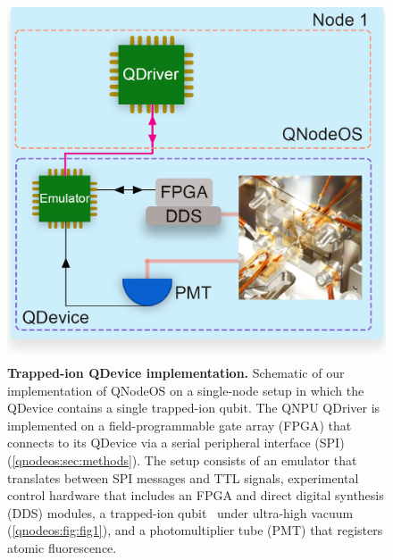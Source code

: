 \begin{figure}[htb]
\centering
\includegraphics[width=1\linewidth]{figures/qnodeos/main/fig5/fig5.png}
\caption{\textbf{Trapped-ion QDevice implementation.} Schematic of our implementation of QNodeOS on a single-node setup in which the QDevice contains a single trapped-ion qubit. The QNPU QDriver is implemented on a field-programmable gate array (FPGA) that connects to its QDevice via a serial peripheral interface (SPI) (\cref{qnodeos:sec:methods}). The setup consists of an emulator that translates between SPI messages and TTL signals, experimental control hardware that includes an FPGA and direct digital synthesis (DDS) modules, a trapped-ion qubit~\cite{teller2023integrating} under ultra-high vacuum (\cref{qnodeos:fig:fig1}), and a photomultiplier tube (PMT) that registers atomic fluorescence.}
\label{qnodeos:fig:fig5}
\end{figure}